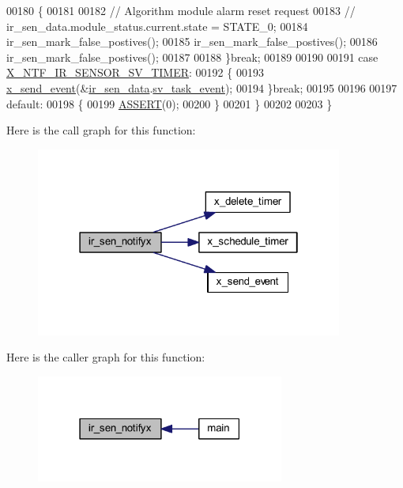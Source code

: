 \begin{DoxyCode}
00180         \{
00181 
00182            \textcolor{comment}{// Algorithm module alarm reset request}
00183             \textcolor{comment}{// ir\_sen\_data.module\_status.current.state = STATE\_0;}
00184              ir\_sen\_mark\_false\_postives();
00185              ir\_sen\_mark\_false\_postives();
00186              ir\_sen\_mark\_false\_postives();
00187 
00188         \}\textcolor{keywordflow}{break};
00189 
00190 
00191         \textcolor{keywordflow}{case} \hyperlink{a00023_a3b0f15b601361fafa871c5e49df7842d}{X\_NTF\_IR\_SENSOR\_SV\_TIMER}:
00192         \{
00193            \hyperlink{a00036_a4bc3d03c8d62c8237329ed4e969fbc1b}{x\_send\_event}(&\hyperlink{a00045_a73dfacb46242746440accc76c7ef710d}{ir\_sen\_data}.\hyperlink{a00023_a43c345f39ea3aefbb60ef1ef57fe5d83}{sv\_task\_event});
00194         \}\textcolor{keywordflow}{break};
00195 
00196 
00197         \textcolor{keywordflow}{default}:
00198         \{
00199             \hyperlink{a00072_abb8ff8e213ac9f6fb21d2b968583b936}{ASSERT}(0);
00200         \}
00201     \}
00202 
00203 \}
\end{DoxyCode}


Here is the call graph for this function\+:\nopagebreak
\begin{figure}[H]
\begin{center}
\leavevmode
\includegraphics[width=286pt]{d6/d97/a00045_a36c6c2cdf9aa5844371e742330789dad_cgraph}
\end{center}
\end{figure}




Here is the caller graph for this function\+:\nopagebreak
\begin{figure}[H]
\begin{center}
\leavevmode
\includegraphics[width=231pt]{d6/d97/a00045_a36c6c2cdf9aa5844371e742330789dad_icgraph}
\end{center}
\end{figure}


